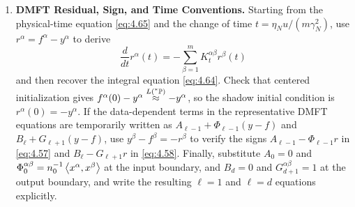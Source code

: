\begin{enumerate}
\item \textbf{DMFT Residual, Sign, and Time Conventions.} Starting from the physical-time equation \eqref{eq:4.65} and the change of time $t = \eta_N u / (m\gamma_N^2)$, use $r^\alpha = f^\alpha - y^\alpha$ to derive
\begin{equation}\label{eq:4.67}
\frac{d}{dt}r^\alpha(t) = -\sum_{\beta=1}^m K_t^{\alpha\beta} r^\beta(t)
\end{equation}
and then recover the integral equation \eqref{eq:4.64}. Check that centered initialization gives $f^\alpha(0) - y^\alpha \stackrel{L({}^*\mathbb{P})}{\approx} -y^\alpha$, so the shadow initial condition is $r^\alpha(0) = -y^\alpha$. If the data-dependent terms in the representative DMFT equations are temporarily written as $A_{\ell-1} + \Phi_{\ell-1}(y - f)$ and $B_\ell + G_{\ell+1}(y - f)$, use $y^\beta - f^\beta = -r^\beta$ to verify the signs $A_{\ell-1} - \Phi_{\ell-1}r$ in \eqref{eq:4.57} and $B_\ell - G_{\ell+1}r$ in \eqref{eq:4.58}. Finally, substitute $A_0 = 0$ and $\Phi_0^{\alpha\beta} = n_0^{-1}\left\langle x^\alpha, x^\beta \right\rangle$ at the input boundary, and $B_d = 0$ and $G_{d+1}^{\alpha\beta} = 1$ at the output boundary, and write the resulting $\ell = 1$ and $\ell = d$ equations explicitly.
\end{enumerate}

